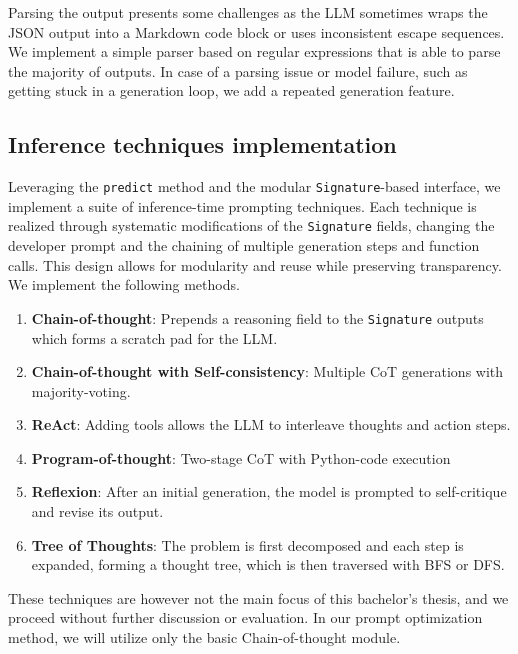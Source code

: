 Parsing the output presents some challenges as the LLM sometimes wraps the JSON output into a Markdown code block
or uses inconsistent escape sequences. We implement a simple parser based on regular expressions that is able to parse 
the majority of outputs. In case of a parsing issue or model failure, such as getting stuck in a generation loop, we add a repeated generation
feature.

\subsection{Inference techniques implementation}
Leveraging the \texttt{predict} method and the modular \texttt{Signature}-based interface, we implement a suite of inference-time prompting techniques. 
Each technique is realized through systematic modifications of the \texttt{Signature} fields, changing the developer prompt and the chaining of multiple generation steps 
and function calls. This design allows for modularity and reuse while preserving transparency.
We implement the following methods.
\begin{enumerate}
    \item \textbf{Chain-of-thought}\cite{NEURIPS2022_8bb0d291}: Prepends a reasoning field to the \texttt{Signature} outputs which forms a scratch pad for the LLM.
    \item \textbf{Chain-of-thought with Self-consistency}\cite{wang2023selfconsistencyimproveschainthought}: Multiple CoT generations with majority-voting.
    \item \textbf{ReAct}\cite{yao2023reactsynergizingreasoningacting}: Adding tools allows the LLM to interleave thoughts and action steps.
    \item \textbf{Program-of-thought}\cite{chen2023programthoughtspromptingdisentangling}: Two-stage CoT with Python-code execution
    \item \textbf{Reflexion}\cite{shinn2023reflexionlanguageagentsverbal}: After an initial generation, the model is prompted to self-critique and revise its output.
    \item \textbf{Tree of Thoughts}\cite{yao2023treethoughtsdeliberateproblem}: The problem is first decomposed and each step is expanded, forming a thought tree, which is then traversed with BFS or DFS.
\end{enumerate}

These techniques are however not the main focus of this bachelor's thesis, and we proceed without further discussion or evaluation.
In our prompt optimization method, we will utilize only the basic Chain-of-thought module.

